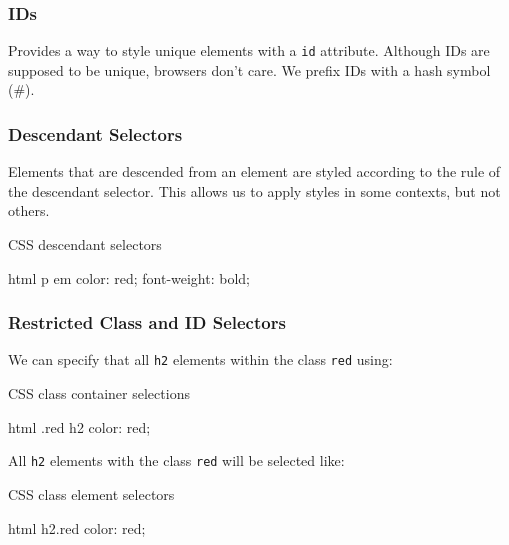 \subsubsection{IDs}\label{ssub:ids}

Provides a way to style unique elements with a \texttt{id} attribute.
Although IDs are supposed to be unique, browsers don't care.
We prefix IDs with a hash symbol (\#).

\subsubsection{Descendant Selectors}\label{ssub:descendant_selectors}

Elements that are descended from an element are styled according to the rule of the descendant selector.
This allows us to apply styles in some contexts, but not others.
\begin{highlight}{CSS descendant selectors}
    \begin{code}{html}
		p em {color: red; font-weight: bold; }
    \end{code}
\end{highlight}

\subsubsection{Restricted Class and ID Selectors}\label{ssub:restricted_class_and_id_selectors}

We can specify that all \texttt{h2} elements within the class \texttt{red} using:
\begin{highlight}{CSS class container selections}
    \begin{code}{html}
		.red h2 {color: red;}
    \end{code}
\end{highlight}
All \texttt{h2} elements with the class \texttt{red} will be selected like:
\begin{highlight}{CSS class element selectors}
    \begin{code}{html}
		h2.red {color: red;}
    \end{code}
\end{highlight}
